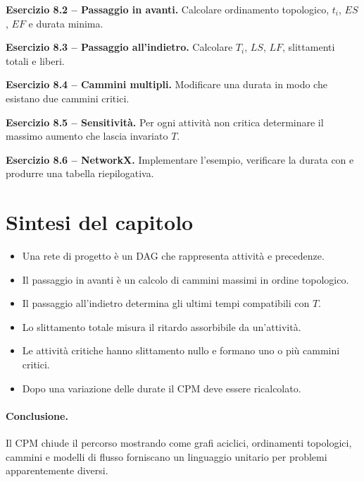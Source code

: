 \documentclass[11pt,a4paper]{article}
\begin{document}
\medskip\textbf{Esercizio 8.2 -- Passaggio in avanti.} Calcolare ordinamento topologico, $t_i$, $ES$, $EF$ e durata minima.

\medskip\textbf{Esercizio 8.3 -- Passaggio all'indietro.} Calcolare $T_i$, $LS$, $LF$, slittamenti totali e liberi.

\medskip\textbf{Esercizio 8.4 -- Cammini multipli.} Modificare una durata in modo che esistano due cammini critici.

\medskip\textbf{Esercizio 8.5 -- Sensitività.} Per ogni attività non critica determinare il massimo aumento che lascia invariato $T$.

\medskip\textbf{Esercizio 8.6 -- NetworkX.} Implementare l'esempio, verificare la durata con  e produrre una tabella riepilogativa.

\section{Sintesi del capitolo}
\begin{learningbox}\begin{itemize}[nosep]
\item Una rete di progetto è un DAG che rappresenta attività e precedenze.
\item Il passaggio in avanti è un calcolo di cammini massimi in ordine topologico.
\item Il passaggio all'indietro determina gli ultimi tempi compatibili con $T$.
\item Lo slittamento totale misura il ritardo assorbibile da un'attività.
\item Le attività critiche hanno slittamento nullo e formano uno o più cammini critici.
\item Dopo una variazione delle durate il CPM deve essere ricalcolato.
\end{itemize}\end{learningbox}

\paragraph{Conclusione.} Il CPM chiude il percorso mostrando come grafi aciclici, ordinamenti topologici, cammini e modelli di flusso forniscano un linguaggio unitario per problemi apparentemente diversi.
\end{document}
